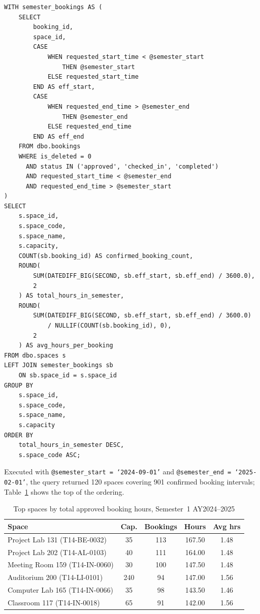 \begin{lstlisting}[style=sqlreport]
WITH semester_bookings AS (
    SELECT
        booking_id,
        space_id,
        CASE
            WHEN requested_start_time < @semester_start
                THEN @semester_start
            ELSE requested_start_time
        END AS eff_start,
        CASE
            WHEN requested_end_time > @semester_end
                THEN @semester_end
            ELSE requested_end_time
        END AS eff_end
    FROM dbo.bookings
    WHERE is_deleted = 0
      AND status IN ('approved', 'checked_in', 'completed')
      AND requested_start_time < @semester_end
      AND requested_end_time > @semester_start
)
SELECT
    s.space_id,
    s.space_code,
    s.space_name,
    s.capacity,
    COUNT(sb.booking_id) AS confirmed_booking_count,
    ROUND(
        SUM(DATEDIFF_BIG(SECOND, sb.eff_start, sb.eff_end) / 3600.0),
        2
    ) AS total_hours_in_semester,
    ROUND(
        SUM(DATEDIFF_BIG(SECOND, sb.eff_start, sb.eff_end) / 3600.0)
            / NULLIF(COUNT(sb.booking_id), 0),
        2
    ) AS avg_hours_per_booking
FROM dbo.spaces s
LEFT JOIN semester_bookings sb
    ON sb.space_id = s.space_id
GROUP BY
    s.space_id,
    s.space_code,
    s.space_name,
    s.capacity
ORDER BY
    total_hours_in_semester DESC,
    s.space_code ASC;
\end{lstlisting}

Executed with \texttt{@semester\_start = `2024-09-01'} and \texttt{@semester\_end
= `2025-02-01'}, the query returned 120 spaces covering 901 confirmed booking
intervals; Table~\ref{tab:aq-q3} shows the top of the ordering.

\begin{table}[htbp]
    \centering
    \small
    \begin{tabularx}{\textwidth}{X c c c c}
        \toprule
        \textbf{Space} & \textbf{Cap.} & \textbf{Bookings} &
        \textbf{Hours} & \textbf{Avg hrs} \\
        \midrule
        Project Lab 131 (T14-BE-0032) & 35 & 113 & 167.50 & 1.48 \\
        Project Lab 202 (T14-AL-0103) & 40 & 111 & 164.00 & 1.48 \\
        Meeting Room 159 (T14-IN-0060) & 30 & 100 & 147.50 & 1.48 \\
        Auditorium 200 (T14-LI-0101) & 240 & 94 & 147.00 & 1.56 \\
        Computer Lab 165 (T14-IN-0066) & 35 & 98 & 143.50 & 1.46 \\
        Classroom 117 (T14-IN-0018) & 65 & 91 & 142.00 & 1.56 \\
        \bottomrule
    \end{tabularx}
    \caption{Top spaces by total approved booking hours, Semester~1 AY2024--2025}
    \label{tab:aq-q3}
\end{table}

